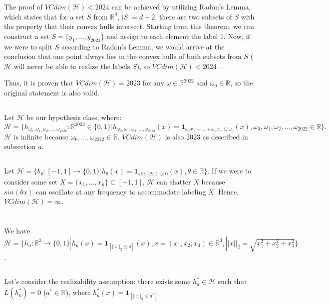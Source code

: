 \documentclass{article}
\newcounter{theorem}
\begin{document}
The proof of $VCdim(\mathcal{H}) < 2024$ can be achieved by utilizing Radon's Lemma, which states that for a set $S$ from $\mathbb{R}^d$, $|S|=d+2$, there are two subsets of $S$ with the property that their convex hulls intersect. Starting from this theorem, we can construct a set $S=\{y_1,...,y_{2024}\}$ and assign to each element the label 1. Now, if we were to split $S$ according to Radon's Lemma, we would arrive at the conclusion that one point always lies in the convex hulls of both subsets from $S$ ($\mathcal{H}$ will never be able to realize the labels $S$), so $VCdim(\mathcal{H}) < 2024$ \cite{vcdim2023}.

Thus, it is proven that $VCdim(\mathcal{H})=2023$ for any $\omega\in\mathbb{R}^{2022}$ and $\omega_0 \in \mathbb{R}$, so the original statement is also valid.
\subsection{}
Let $\mathcal{H}$ be our hypothesis class, where:
$
\mathcal{H}=\{h_{\omega_0, \omega_1,\omega_2,...,\omega_{2022}}:\mathbb{R}^{2022}\in\{0,1\}|h_{\omega_0, \omega_1,\omega_2,...,\omega_{2022}}(x) = \mathbf{1}_{\omega_1x_1 + ... + \omega_nx_n \leq \omega_0}(x), \omega_0, \omega_1,\omega_2,...,\omega_{2022}\in \mathbb{R}\}.
$
$\mathcal{H}$ is infinite because $\omega_0,...,\omega_{2022}\in\mathbb{R}$. $VCdim(\mathcal{H})$ is also 2023 as described in subsection $a$.
\subsection{}
Let $\mathcal{H}=\{ h_\theta:[-1,1]\rightarrow\{0,1\}|h_\theta(x)=\mathbf{1}_{sin(\theta x) \geq 0}(x), \theta \in \mathbb{R}\}$. If we were to consider some set $X=\{x_1,...,x_n\}\subset[-1,1]$, $\mathcal{H}$ can shatter $X$ because $sin(\theta x)$ can oscillate at any frequency to accommodate labeling $X$. Hence, $VCdim(\mathcal{H})=\infty$. 

\section{}
We have $\mathcal{H}=\{ h_a:\mathbb{R}^3\rightarrow \{0,1\}|h_a(x)=\mathbf{1}_{[||x||_2\leq a]}(x), x=(x_1,x_2,x_3)\in\mathbb{R}^3, ||x||_2 = \sqrt{x_1^2+x_2^2+x_3^2} \}$.
\subsection{}
Let's consider the realizability assumption: there exists some $h_a^*\in\mathcal{H}$ such that $L(h_a^*)=0$ ($a^*\in\mathbb{R}$), where $h_a^*(x)=\mathbf{1}_{[||x||_2\leq a^*]}$.
\end{document}
